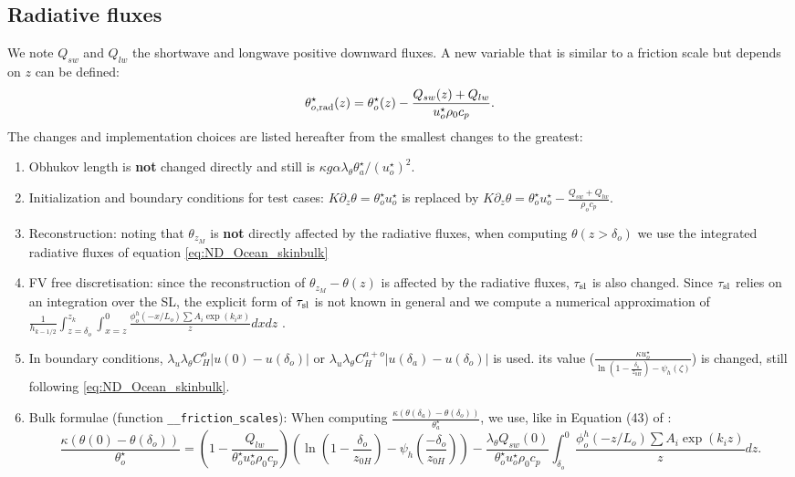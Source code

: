 \subsection{Radiative fluxes}
We note $Q_{sw}$ and $Q_{lw}$ the shortwave and longwave positive
downward fluxes. A new variable that is similar to a friction
scale but depends on $z$ can be defined:
\begin{equation}
\theta^\star_{o, \rm rad}(z) =
	\theta^\star_{o}(z) -
	\frac{Q_{sw}(z) + Q_{lw}}{u^{\star}_o\rho_0 c_p}.
\end{equation}
The changes and implementation choices are listed hereafter from
the smallest changes to the greatest:
\begin{enumerate}
	\item Obhukov length is \textbf{not} changed directly and
		still is $\kappa g \alpha \lambda_\theta
		\theta^\star_a / (u^\star_o)^2$.
	\item Initialization and boundary conditions for test cases:
		$K\partial_z \theta = \theta^{\star}_o u^{\star}_o$
		is replaced by
		$K\partial_z \theta = \theta^{\star}_o u^{\star}_o
		- \frac{Q_{sw} + Q_{lw}}{\rho_o c_p}$.
	\item Reconstruction: noting that $\theta_{z_M}$ is
		\textbf{not} directly affected by the
		radiative fluxes, when computing $\theta(z>\delta_o)$
		we use the integrated radiative fluxes of
		equation \eqref{eq:ND_Ocean_skinbulk}
	\item FV free discretisation: since the reconstruction
		of $\theta_{z_M} - \theta(z)$ is affected by
		the radiative fluxes, $\tau_{\rm sl}$ is also
		changed. Since $\tau_{\rm sl}$ relies on an
		integration over the SL, the explicit form
		of $\tau_{\rm sl}$ is not known in general
		and we compute a numerical approximation of
		$\frac{1}{h_{k-1/2}}\int_{z=\delta_o}^{z_k}
		\int_{x=z}^0 \frac{\phi^h_o(-x/L_o)
		\sum A_i \exp (k_i x)
		}{z}dx dz$
		.
	\item In boundary conditions, $\lambda_u \lambda_\theta C_H^o
		|u(0)-u(\delta_o)|$ or
		$\lambda_u \lambda_\theta C_H^{a+o}
		|u(\delta_a)-u(\delta_o)|$ is used.
		its value ($\frac{\kappa u^{\star}_o}
		{\ln(1-\frac{\delta_o}{z_{0H}}) - \psi_h(\zeta)}$)
		is changed, still following
		\eqref{eq:ND_Ocean_skinbulk}.
	\item Bulk formulae (function \verb|__friction_scales|):
		When computing
		$\frac{\kappa (\theta(\delta_a) - \theta(\delta_o))}
		{\theta_a^{\star}}$,
		we use, like in
		Equation (43) of \citep{pelletier2021two}:
	\begin{equation}
		\label{eq:ND_Ocean_skinbulk}
		\frac{\kappa (\theta(0) - \theta(\delta_o))}
		{\theta_o^{\star}} = (1 -
		\frac{Q_{lw}}{\theta_o^{\star}u_o^{\star}\rho_0 c_p})
		\left(\ln (1 - \frac{\delta_o}{z_{0H}}) -
		\psi_h(\frac{-\delta_o}{z_{0H}})\right)
		- \frac{\lambda_\theta Q_{sw}(0)}
		{\theta_o^{\star}u_o^{\star}\rho_0 c_p}
		\int_{\delta_o}^0 \frac{\phi^h_o(-z/L_o)
		\sum A_i \exp (k_i z)
		}{z}dz.
	\end{equation}
\end{enumerate}
